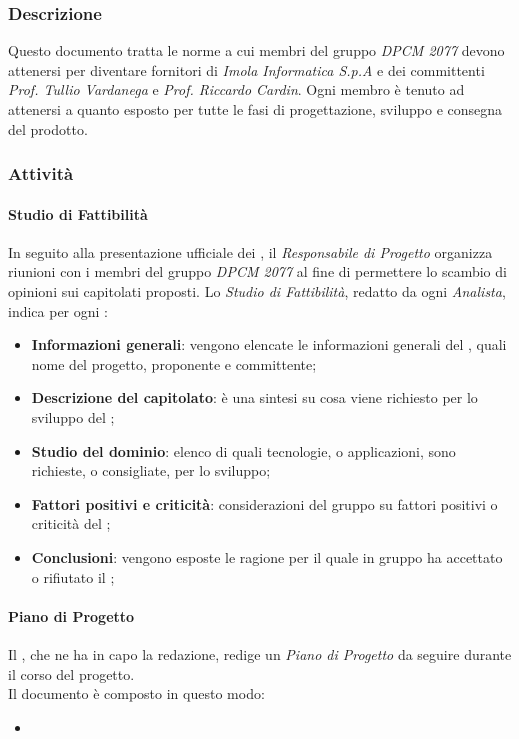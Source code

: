 		\subsubsection{Descrizione}
		Questo documento tratta le norme a cui membri del gruppo \textit{DPCM 2077} devono attenersi per diventare fornitori di \textit{Imola Informatica S.p.A} e dei committenti \textit{Prof. Tullio Vardanega} e \textit{Prof. Riccardo Cardin}. Ogni membro è tenuto ad attenersi a quanto esposto per tutte le fasi di progettazione, sviluppo e consegna del prodotto.
		\subsubsection{Attività}
			\paragraph{Studio di Fattibilità}
			In seguito alla presentazione ufficiale dei , il \textit{Responsabile di Progetto} organizza riunioni con i membri del gruppo \textit{DPCM 2077} al fine di permettere lo scambio di opinioni sui capitolati proposti. Lo \textit{Studio di Fattibilità}, redatto da ogni \textit{Analista}, indica per ogni :
			\begin{itemize}
				\item \textbf{Informazioni generali}: vengono elencate le informazioni generali del , quali nome del progetto, proponente e committente;
				\item \textbf{Descrizione del capitolato}: è una sintesi su cosa viene richiesto per lo sviluppo del ;
				\item \textbf{Studio del dominio}: elenco di quali tecnologie, o applicazioni, sono richieste, o consigliate, per lo sviluppo;
				\item \textbf{Fattori positivi e criticità}: considerazioni del gruppo su fattori positivi o criticità del ;
				\item \textbf{Conclusioni}: vengono esposte le ragione per il quale in gruppo ha accettato o rifiutato il ;
			\end{itemize}
			\paragraph{Piano di Progetto}
			Il , che ne ha in capo la redazione, redige un \textit{Piano di Progetto} da seguire durante	il corso del progetto.
			\\
			Il documento è composto in questo modo: 
			\begin{itemize}
				\item 
			\end{itemize}
